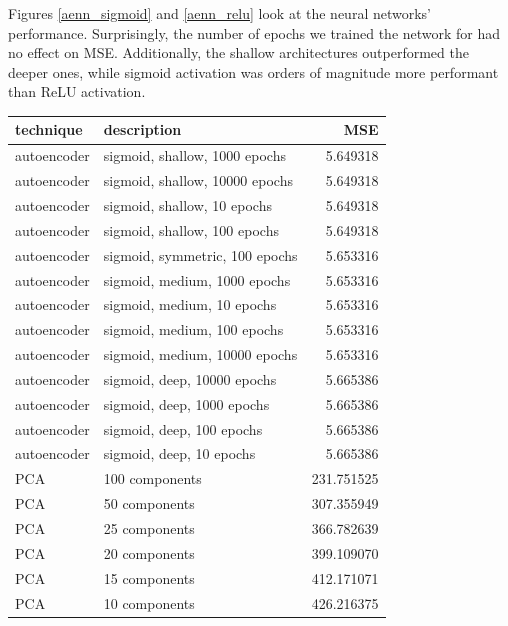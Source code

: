\documentclass{article}
\begin{document}
Figures \ref{aenn_sigmoid} and \ref{aenn_relu} look at the neural networks' performance. Surprisingly, the number of epochs we trained the network for had no effect on MSE. Additionally, the shallow architectures outperformed the deeper ones, while sigmoid activation was orders of magnitude more performant than ReLU activation.

\begin{table}
    \centering\small
\begin{tabular}{llr}
\toprule
     technique &                     description &          MSE \\
\midrule
autoencoder &   sigmoid, shallow, 1000 epochs &     5.649318 \\
autoencoder &  sigmoid, shallow, 10000 epochs &     5.649318 \\
autoencoder &     sigmoid, shallow, 10 epochs &     5.649318 \\
autoencoder &    sigmoid, shallow, 100 epochs &     5.649318 \\
autoencoder &  sigmoid, symmetric, 100 epochs &     5.653316 \\
autoencoder &    sigmoid, medium, 1000 epochs &     5.653316 \\
autoencoder &      sigmoid, medium, 10 epochs &     5.653316 \\
autoencoder &     sigmoid, medium, 100 epochs &     5.653316 \\
autoencoder &   sigmoid, medium, 10000 epochs &     5.653316 \\
autoencoder &     sigmoid, deep, 10000 epochs &     5.665386 \\
autoencoder &      sigmoid, deep, 1000 epochs &     5.665386 \\
autoencoder &       sigmoid, deep, 100 epochs &     5.665386 \\
autoencoder &        sigmoid, deep, 10 epochs &     5.665386 \\
        PCA &                  100 components &   231.751525 \\
        PCA &                   50 components &   307.355949 \\
        PCA &                   25 components &   366.782639 \\
        PCA &                   20 components &   399.109070 \\
        PCA &                   15 components &   412.171071 \\
        PCA &                   10 components &   426.216375 \\

\end{tabular}
\end{table}
\end{document}
